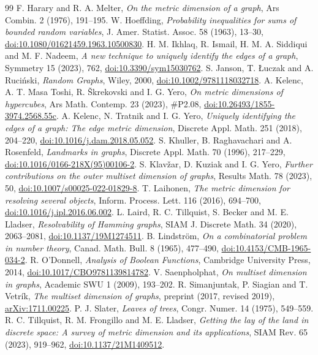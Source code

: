 \documentclass[11pt]{article}
\theoremstyle{definition}
\begin{document}
\begin{thebibliography}{99}
 F. Harary and R. A. Melter, \emph{On the metric dimension of a graph}, Ars Combin. 2 (1976), 191--195.
 W. Hoeffding, \emph{Probability inequalities for sums of bounded random variables}, J. Amer. Statist. Assoc. 58 (1963), 13--30, \href{https://doi.org/10.1080/01621459.1963.10500830}{doi:10.1080/01621459.1963.10500830}.
 H. M. Ikhlaq, R. Ismail, H. M. A. Siddiqui and M. F. Nadeem, \emph{A new technique to uniquely identify the edges of a graph}, Symmetry 15 (2023), 762, \href{https://doi.org/10.3390/sym15030762}{doi:10.3390/sym15030762}.
 S. Janson, T. {\L}uczak and A. Ruci\'nski, \emph{Random Graphs}, Wiley, 2000, \href{https://doi.org/10.1002/9781118032718}{doi:10.1002/9781118032718}.
 A. Kelenc, A. T. Masa Toshi, R. \v{S}krekovski and I. G. Yero, \emph{On metric dimensions of hypercubes}, Ars Math. Contemp. 23 (2023), \#P2.08, \href{https://doi.org/10.26493/1855-3974.2568.55c}{doi:10.26493/1855-3974.2568.55c}.
 A. Kelenc, N. Tratnik and I. G. Yero, \emph{Uniquely identifying the edges of a graph: The edge metric dimension}, Discrete Appl. Math. 251 (2018), 204--220, \href{https://doi.org/10.1016/j.dam.2018.05.052}{doi:10.1016/j.dam.2018.05.052}.
 S. Khuller, B. Raghavachari and A. Rosenfeld, \emph{Landmarks in graphs}, Discrete Appl. Math. 70 (1996), 217--229, \href{https://doi.org/10.1016/0166-218X(95)00106-2}{doi:10.1016/0166-218X(95)00106-2}.
 S. Klav\v{z}ar, D. Kuziak and I. G. Yero, \emph{Further contributions on the outer multiset dimension of graphs}, Results Math. 78 (2023), 50, \href{https://doi.org/10.1007/s00025-022-01829-8}{doi:10.1007/s00025-022-01829-8}.
 T. Laihonen, \emph{The metric dimension for resolving several objects}, Inform. Process. Lett. 116 (2016), 694--700, \href{https://doi.org/10.1016/j.ipl.2016.06.002}{doi:10.1016/j.ipl.2016.06.002}.
 L. Laird, R. C. Tillquist, S. Becker and M. E. Lladser, \emph{Resolvability of Hamming graphs}, SIAM J. Discrete Math. 34 (2020), 2063--2081, \href{https://doi.org/10.1137/19M1274511}{doi:10.1137/19M1274511}.
 B. Lindstr\"om, \emph{On a combinatorial problem in number theory}, Canad. Math. Bull. 8 (1965), 477--490, \href{https://doi.org/10.4153/CMB-1965-034-2}{doi:10.4153/CMB-1965-034-2}.
 R. O'Donnell, \emph{Analysis of Boolean Functions}, Cambridge University Press, 2014, \href{https://doi.org/10.1017/CBO9781139814782}{doi:10.1017/CBO9781139814782}.
 V. Saenpholphat, \emph{On multiset dimension in graphs}, Academic SWU 1 (2009), 193--202.
 R. Simanjuntak, P. Siagian and T. Vetr\'ik, \emph{The multiset dimension of graphs}, preprint (2017, revised 2019), \href{https://arxiv.org/abs/1711.00225}{arXiv:1711.00225}.
 P. J. Slater, \emph{Leaves of trees}, Congr. Numer. 14 (1975), 549--559.
 R. C. Tillquist, R. M. Frongillo and M. E. Lladser, \emph{Getting the lay of the land in discrete space: A survey of metric dimension and its applications}, SIAM Rev. 65 (2023), 919--962, \href{https://doi.org/10.1137/21M1409512}{doi:10.1137/21M1409512}.
\end{thebibliography}
\end{document}
